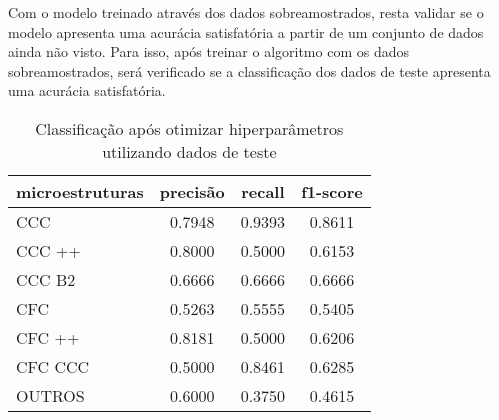 Com o modelo treinado através dos dados sobreamostrados, resta validar se o modelo apresenta uma acurácia satisfatória a partir de um conjunto de dados ainda não visto. Para isso, após treinar o algoritmo com os dados sobreamostrados, será verificado se a classificação dos dados de teste apresenta uma acurácia satisfatória.
\pagebreak
\begin{table}[htb]
\centering
\caption{Classificação após otimizar hiperparâmetros utilizando dados de teste}
\begin{supertabular}{l|c|c|c}
\hline
{ microestruturas } & { precisão } & { recall } & { f1-score } \\\hline
{ CCC } &           {0.7948} &  {0.9393} & {0.8611} \\\hline
{ CCC ++ } &        {0.8000} &  {0.5000} & {0.6153} \\\hline
{ CCC B2 } &        {0.6666} &  {0.6666} & {0.6666} \\\hline
{ CFC } &           {0.5263} &  {0.5555} & {0.5405} \\\hline
{ CFC ++ } &        {0.8181} &  {0.5000} & {0.6206} \\\hline
{ CFC CCC } &       {0.5000} &  {0.8461} & {0.6285} \\\hline
{ OUTROS } &         {0.6000} &  {0.3750} & {0.4615} \\\hline
\end{supertabular}
    \label{table:relatorio_otimizados_validacao}
\end{table}

\pagebreak

